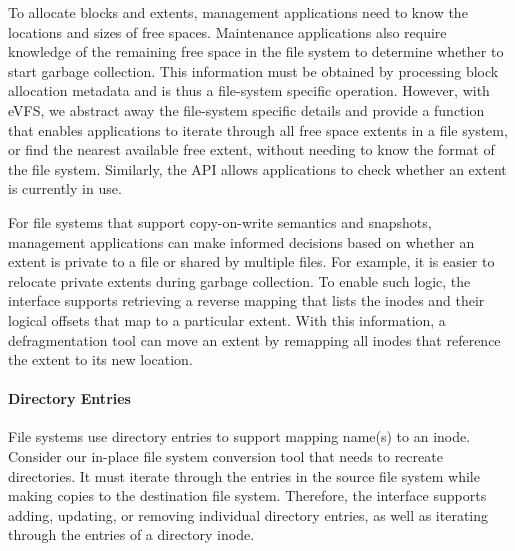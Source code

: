 To allocate blocks and extents, management applications need to know the locations and sizes of free spaces. Maintenance applications also require knowledge of the remaining free space in the file system to determine whether to start garbage collection. This information must be obtained by processing block allocation metadata and is thus a file-system specific operation. However, with eVFS, we abstract away the file-system specific details and provide a function that enables applications to iterate through all free space extents in a file system, or find the nearest available free extent, without needing to know the format of the file system. Similarly, the API allows applications to check whether an extent is currently in use.



For file systems that support copy-on-write semantics and snapshots, management applications can make informed decisions based on whether an extent is private to a file or shared by multiple files. For example, it is easier to relocate private extents during garbage collection. To enable such logic, the interface supports retrieving a reverse mapping that lists the inodes and their logical offsets that map to a particular extent. With this information, a defragmentation tool can move an extent by remapping all inodes that reference the extent to its new location.

\paragraph{Directory Entries} File systems use directory entries to support mapping name(s) to an inode. Consider our in-place file system conversion tool that needs to recreate directories. It must iterate through the entries in the source file system while making copies to the destination file system. Therefore, the interface supports adding, updating, or removing individual directory entries, as well as iterating through the entries of a directory inode.

